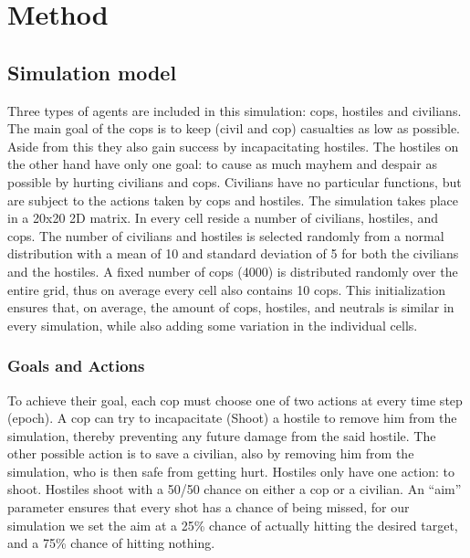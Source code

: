 \section{Method}
\subsection{Simulation model}
Three types of agents are included in this simulation: cops, hostiles and civilians.
The main goal of the cops is to keep (civil and cop) casualties as low as possible. Aside from this they also gain success by incapacitating hostiles.
The hostiles on the other hand have only one goal: to cause as much mayhem and despair as possible by hurting civilians and cops.
Civilians have no particular functions, but are subject to the actions taken by cops and hostiles.
The simulation takes place in a 20x20 2D matrix.
In every cell reside a number of civilians, hostiles, and cops.
The number of civilians and hostiles is selected randomly from a normal distribution 
with a mean of 10 and standard deviation of 5 for both the civilians and the hostiles.
A fixed number of cops (4000) is distributed randomly over the entire grid,
thus on average every cell also contains 10 cops.
This initialization ensures that, on average, the amount of cops, hostiles, and neutrals is 
similar in every simulation, while also adding some variation in the individual cells.

\subsubsection{Goals and Actions}
To achieve their goal, each cop must choose one of two actions at every time step (epoch).
A cop can try to incapacitate (Shoot) a hostile to remove him from the simulation,
thereby preventing any future damage from the said hostile.
The other possible action is to save a civilian, also by removing him from the simulation, who is then safe from getting hurt.
Hostiles only have one action: to shoot.
Hostiles shoot with a 50/50 chance on either a cop or a civilian. 
An ``aim'' parameter ensures that every shot has a chance of being missed,
for our simulation we set the aim at a 25\% chance of actually hitting the desired target,
and a 75\% chance of hitting nothing.

